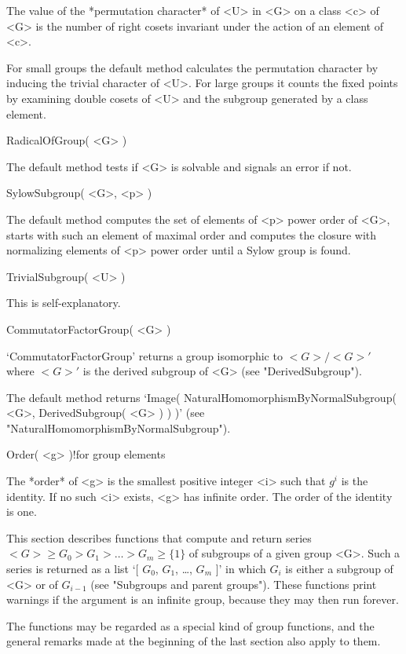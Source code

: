 The value of the *permutation character* of <U>  in <G> on a class <c> of
<G>  is the number of  right  cosets  invariant  under  the action  of an
element of <c>.

For small groups the  default method calculates the permutation character
by inducing the trivial character of <U>. For  large groups it counts the
fixed points by examining double cosets of <U> and the subgroup generated
by a class element.

\>RadicalOfGroup( <G> )

The default method tests if <G> is solvable and signals an error if not.

\>SylowSubgroup( <G>, <p> )

The default method computes the  set of  elements  of <p> power order  of
<G>,  starts   with such an element   of  maximal order  and computes the
closure with normalizing elements of <p> power  order until a Sylow group
is found.

\>TrivialSubgroup( <U> )

This is self-explanatory.

\>CommutatorFactorGroup( <G> )

`CommutatorFactorGroup' returns a  group  isomorphic to  $<G>/<G>'$ where
$<G>'$ is the derived subgroup of <G> (see "DerivedSubgroup").

The default method returns `Image(   NaturalHomomorphismByNormalSubgroup(
<G>,         DerivedSubgroup(       <G>      )       )       )'      (see
"NaturalHomomorphismByNormalSubgroup").

\>Order( <g> )!{for group elements}

The *order* of <g>  is the smallest positive integer  <i> such that $g^i$
is the identity. If no such <i> exists, <g> has infinite order. The order
of the identity is one.


This section describes functions that compute and  return series $<G> \ge
G_0 >  G_1 > \ldots  > G_m \ge \{1\}$ of  subgroups of a given group <G>.
Such a series is returned  as a list `[ $G_0$,  $G_1$, \dots, $G_m$ ]' in
which $G_i$ is either a  subgroup of <G> or  of $G_{i-1}$ (see "Subgroups
and parent groups"). These functions print warnings if the argument is an
infinite group, because they may then run forever.

The functions may  be regarded as a  special kind of group functions, and
the general remarks made at the beginning  of the last section also apply
to them.

